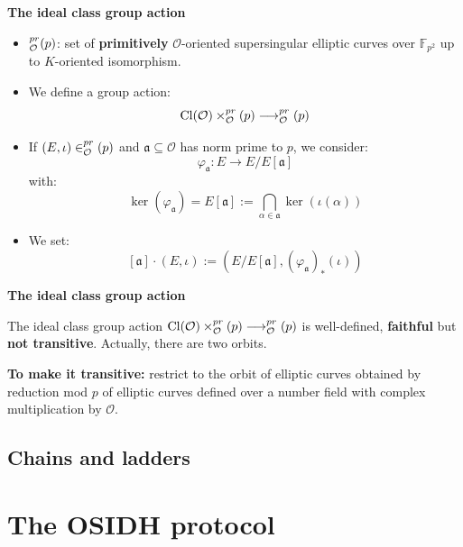 \documentclass[10pt]{beamer}
\theoremstyle{plain}
\theoremstyle{definition}
\newcommand{\F}{\mathbb{F}}
\newcommand{\mO}{\mathcal{O}}
\renewcommand{\(}{\left(}
\renewcommand{\)}{\right)}
\newcommand{\mf}[1]{\mathfrak{#1}}
\DeclareMathOperator{\Cl}{Cl}
\let\SS\relax
\DeclareMathOperator{\SS}{SS}
\begin{document}
\begin{frame}
\textbf{The ideal class group action}

\vspace{0.5cm}

\begin{itemize}
\item $\SS_{\mO}^{pr}(p)$: set of \textbf{primitively} $\mO$-oriented supersingular elliptic curves over $\F_{p^2}$ up to $K$-oriented isomorphism.
\item We define a group action:
\[\Cl(\mO)\times\SS_{\mO}^{pr}(p)\longrightarrow \SS_{\mO}^{pr}(p)\]
\item If $(E,\iota)\in \SS_{\mO}^{pr}(p)$ and $\mf{a}\subseteq\mO$ has norm prime to $p$, we consider:
\[\varphi_{\mf{a}}:E\longrightarrow E/E[\mf{a}]\]
with:
\[\ker(\varphi_{\mf{a}})=E[\mf{a}]:=\bigcap_{\alpha\in\mf{a}}\ker(\iota(\alpha))\]
\item We set:
\[[\mf{a}]\cdot (E,\iota):=(E/E[\mf{a}],(\varphi_{\mf{a}})_*(\iota))\]
\end{itemize}
\end{frame}

\begin{frame}
\textbf{The ideal class group action}

\vspace{0.5cm}

\begin{theorem}
The ideal class group action $\Cl(\mO)\times\SS_{\mO}^{pr}(p)\longrightarrow \SS_{\mO}^{pr}(p)$ is well-defined, \textbf{faithful} but \textbf{not transitive}. Actually, there are two orbits.
\end{theorem}

\vspace{0.5cm}

\pause

\textbf{To make it transitive:} restrict to the orbit of elliptic curves obtained by reduction mod $p$ of elliptic curves defined over a number field with complex multiplication by $\mO$. 

\end{frame}

\subsection{Chains and ladders}

\section{The OSIDH protocol}
\end{document}
